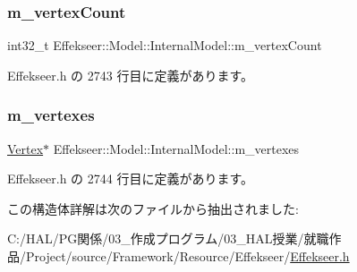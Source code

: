 \subsubsection{\texorpdfstring{m\+\_\+vertex\+Count}{m\_vertexCount}}
{\footnotesize\ttfamily int32\+\_\+t Effekseer\+::\+Model\+::\+Internal\+Model\+::m\+\_\+vertex\+Count}



 Effekseer.\+h の 2743 行目に定義があります。

\mbox{\label{struct_effekseer_1_1_model_1_1_internal_model_a8a41ac246ef524cf4aa0197b2ce1b449}} 
\subsubsection{\texorpdfstring{m\+\_\+vertexes}{m\_vertexes}}
{\footnotesize\ttfamily \mbox{\hyperlink{struct_effekseer_1_1_model_1_1_vertex}{Vertex}}$\ast$ Effekseer\+::\+Model\+::\+Internal\+Model\+::m\+\_\+vertexes}



 Effekseer.\+h の 2744 行目に定義があります。



この構造体詳解は次のファイルから抽出されました\+:\begin{DoxyCompactItemize}
\item 
C\+:/\+H\+A\+L/\+P\+G関係/03\+\_\+作成プログラム/03\+\_\+\+H\+A\+L授業/就職作品/\+Project/source/\+Framework/\+Resource/\+Effekseer/\mbox{\hyperlink{_effekseer_8h}{Effekseer.\+h}}\end{DoxyCompactItemize}
